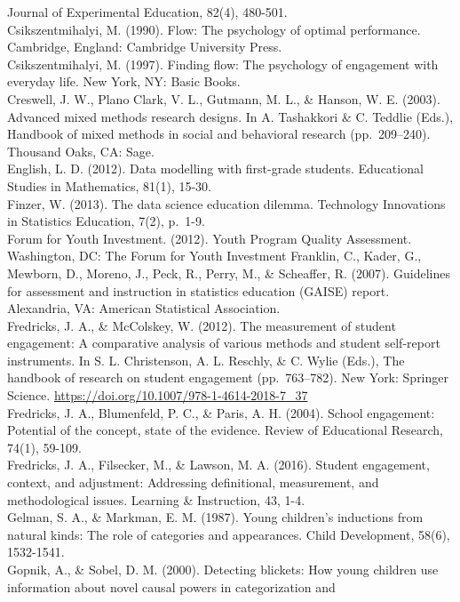 \documentclass[]{book}
\theoremstyle{definition}
\theoremstyle{definition}
\theoremstyle{definition}
\theoremstyle{remark}
\begin{document}
Journal of Experimental Education, 82(4), 480-501.\\
Csikszentmihalyi, M. (1990). Flow: The psychology of optimal
performance. Cambridge, England: Cambridge University Press.\\
Csikszentmihalyi, M. (1997). Finding flow: The psychology of engagement
with everyday life. New York, NY: Basic Books.\\
Creswell, J. W., Plano Clark, V. L., Gutmann, M. L., \& Hanson, W. E.
(2003). Advanced mixed methods research designs. In A. Tashakkori \& C.
Teddlie (Eds.), Handbook of mixed methods in social and behavioral
research (pp.~209--240). Thousand Oaks, CA: Sage.\\
English, L. D. (2012). Data modelling with first-grade students.
Educational Studies in Mathematics, 81(1), 15-30.\\
Finzer, W. (2013). The data science education dilemma. Technology
Innovations in Statistics Education, 7(2), p.~1-9.\\
Forum for Youth Investment. (2012). Youth Program Quality Assessment.
Washington, DC: The Forum for Youth Investment Franklin, C., Kader, G.,
Mewborn, D., Moreno, J., Peck, R., Perry, M., \& Scheaffer, R. (2007).
Guidelines for assessment and instruction in statistics education
(GAISE) report. Alexandria, VA: American Statistical Association.\\
Fredricks, J. A., \& McColskey, W. (2012). The measurement of student
engagement: A comparative analysis of various methods and student
self-report instruments. In S. L. Christenson, A. L. Reschly, \& C.
Wylie (Eds.), The handbook of research on student engagement
(pp.~763--782). New York: Springer Science.
\url{https://doi.org/10.1007/978-1-4614-2018-7_37}\\
Fredricks, J. A., Blumenfeld, P. C., \& Paris, A. H. (2004). School
engagement: Potential of the concept, state of the evidence. Review of
Educational Research, 74(1), 59-109.\\
Fredricks, J. A., Filsecker, M., \& Lawson, M. A. (2016). Student
engagement, context, and adjustment: Addressing definitional,
measurement, and methodological issues. Learning \& Instruction, 43,
1-4.\\
Gelman, S. A., \& Markman, E. M. (1987). Young children's inductions
from natural kinds: The role of categories and appearances. Child
Development, 58(6), 1532-1541.\\
Gopnik, A., \& Sobel, D. M. (2000). Detecting blickets: How young
children use information about novel causal powers in categorization and
\end{document}
